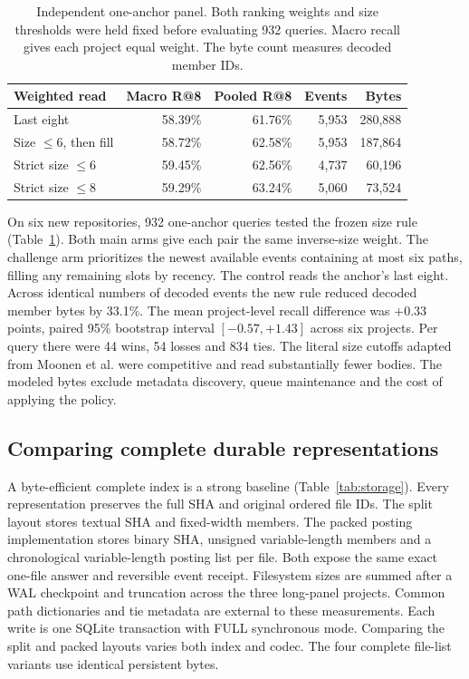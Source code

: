 \documentclass[conference]{IEEEtran}
\begin{document}
\begin{table}[t]
\caption{Independent one-anchor panel. Both ranking weights and size thresholds were held fixed before evaluating 932 queries. Macro recall gives each project equal weight. The byte count measures decoded member IDs.}
\label{tab:replication}\centering\small
\setlength{\tabcolsep}{3.5pt}
\begin{tabular}{@{}lrrrr@{}}\toprule
Weighted read & Macro R@8 & Pooled R@8 & Events & Bytes \\\midrule
Last eight & 58.39\% & 61.76\% & 5,953 & 280,888\\
Size $\le6$, then fill & 58.72\% & 62.58\% & 5,953 & 187,864\\
Strict size $\le6$ & 59.45\% & 62.56\% & 4,737 & 60,196\\
Strict size $\le8$ & 59.29\% & 63.24\% & 5,060 & 73,524\\\bottomrule
\end{tabular}
\end{table}

On six new repositories, 932 one-anchor queries tested the frozen size rule (Table~\ref{tab:replication}). Both main arms give each pair the same inverse-size weight. The challenge arm prioritizes the newest available events containing at most six paths, filling any remaining slots by recency. The control reads the anchor's last eight. Across identical numbers of decoded events the new rule reduced decoded member bytes by 33.1\%. The mean project-level recall difference was $+0.33$ points, paired 95\% bootstrap interval $[-0.57,+1.43]$ across six projects. Per query there were 44 wins, 54 losses and 834 ties. The literal size cutoffs adapted from Moonen et al. were competitive and read substantially fewer bodies. The modeled bytes exclude metadata discovery, queue maintenance and the cost of applying the policy.

\subsection{Comparing complete durable representations}
A byte-efficient complete index is a strong baseline (Table~\ref{tab:storage}). Every representation preserves the full SHA and original ordered file IDs. The split layout stores textual SHA and fixed-width members. The packed posting implementation stores binary SHA, unsigned variable-length members and a chronological variable-length posting list per file. Both expose the same exact one-file answer and reversible event receipt. Filesystem sizes are summed after a WAL checkpoint and truncation across the three long-panel projects. Common path dictionaries and tie metadata are external to these measurements. Each write is one SQLite transaction with FULL synchronous mode. Comparing the split and packed layouts varies both index and codec. The four complete file-list variants use identical persistent bytes.
\end{document}
